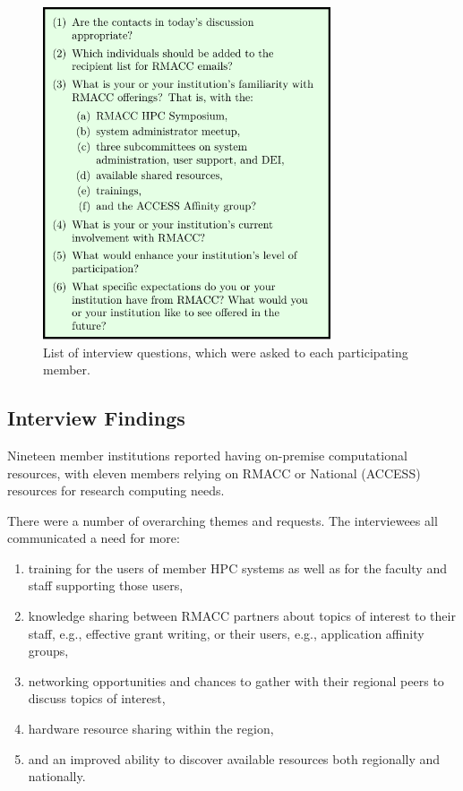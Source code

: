\documentclass[sigconf]{acmart}
\theoremstyle{plain}
\begin{document}
\begin{figure}
  \begin{center}
    \includegraphics[width=8.5cm]{figs/interview-questions-highlight.pdf}
  \end{center}
  \caption{\label{item:interview}%
    List of interview questions, which were asked to each participating
    member.%
  }
\end{figure}

\subsection{Interview Findings}

Nineteen member institutions reported having on-premise computational
resources, with eleven members relying on RMACC or National (ACCESS)
resources for research computing needs.

There were a number of overarching themes and requests. The interviewees
all communicated a need for more:
\begin{enumerate}%
  \item
  training for the users of member HPC systems as well as for the
  faculty and staff supporting those users,
  \item
  knowledge sharing between RMACC partners about topics of interest to
  their staff, e.g., effective grant writing, or their users, e.g.,
  application affinity groups,
  \item
  networking opportunities and chances to gather with their regional
  peers to discuss topics of interest,
  \item
  hardware resource sharing within the region,
  \item
  and an improved ability to discover available resources both
  regionally and nationally.
\end{enumerate}
\end{document}
